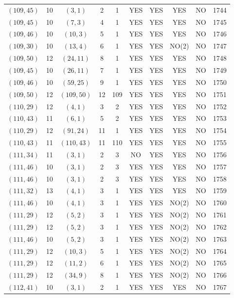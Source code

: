 \begin{longtable}{|c|c|c|c|c|c|c|c|c|c|}
$(109, 45)$ & 10 & $(3, 1)$ & 2 & 1 & YES & YES & YES & NO & 1744\\
$(109, 45)$ & 10 & $(7, 3)$ & 4 & 1 & YES & YES & YES & NO & 1745\\
$(109, 46)$ & 10 & $(10, 3)$ & 5 & 1 & YES & YES & YES & NO & 1746\\
$(109, 30)$ & 10 & $(13, 4)$ & 6 & 1 & YES & YES & NO(2) & NO & 1747\\
$(109, 50)$ & 12 & $(24, 11)$ & 8 & 1 & YES & YES & YES & NO & 1748\\
$(109, 45)$ & 10 & $(26, 11)$ & 7 & 1 & YES & YES & YES & NO & 1749\\
$(109, 46)$ & 10 & $(59, 25)$ & 9 & 1 & YES & YES & YES & NO & 1750\\
$(109, 50)$ & 12 & $(109, 50)$ & 12 & 109 & YES & YES & YES & NO & 1751\\
$(110, 29)$ & 12 & $(4, 1)$ & 3 & 2 & YES & YES & YES & NO & 1752\\
$(110, 43)$ & 11 & $(6, 1)$ & 5 & 2 & YES & YES & YES & NO & 1753\\
$(110, 29)$ & 12 & $(91, 24)$ & 11 & 1 & YES & YES & YES & NO & 1754\\
$(110, 43)$ & 11 & $(110, 43)$ & 11 & 110 & YES & YES & YES & NO & 1755\\
$(111, 34)$ & 11 & $(3, 1)$ & 2 & 3 & NO & YES & YES & NO & 1756\\
$(111, 46)$ & 10 & $(3, 1)$ & 2 & 3 & YES & YES & YES & NO & 1757\\
$(111, 46)$ & 10 & $(3, 1)$ & 2 & 3 & YES & YES & YES & NO & 1758\\
$(111, 32)$ & 13 & $(4, 1)$ & 3 & 1 & YES & YES & YES & NO & 1759\\
$(111, 46)$ & 10 & $(4, 1)$ & 3 & 1 & YES & YES & NO(2) & NO & 1760\\
$(111, 29)$ & 12 & $(5, 2)$ & 3 & 1 & YES & YES & NO(2) & NO & 1761\\
$(111, 29)$ & 12 & $(5, 2)$ & 3 & 1 & YES & YES & NO(2) & NO & 1762\\
$(111, 46)$ & 10 & $(5, 2)$ & 3 & 1 & YES & YES & NO(2) & NO & 1763\\
$(111, 29)$ & 12 & $(10, 3)$ & 5 & 1 & YES & YES & NO(2) & NO & 1764\\
$(111, 29)$ & 12 & $(11, 2)$ & 6 & 1 & YES & YES & NO(2) & NO & 1765\\
$(111, 29)$ & 12 & $(34, 9)$ & 8 & 1 & YES & YES & NO(2) & NO & 1766\\
$(112, 41)$ & 10 & $(3, 1)$ & 2 & 1 & YES & YES & YES & NO & 1767\\

\end{longtable}
